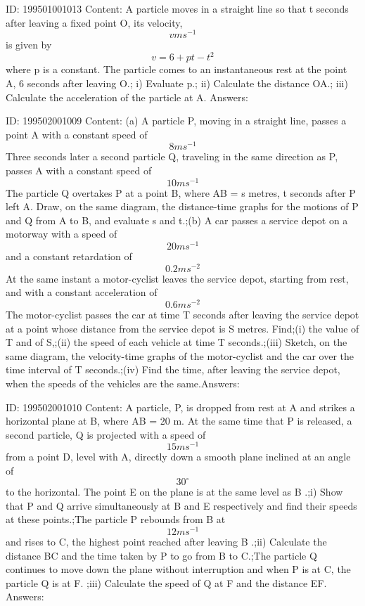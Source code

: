 \documentclass{article}
\begin{document}
ID: 199501001013
Content:
A particle moves in a straight line so that t seconds after leaving a fixed point O, its velocity, \[v ms^{-1}\] is given by \[v=6+pt-t^{2}\] where p is a constant. The particle comes to an instantaneous rest at the point A, 6 seconds after leaving O.;
i) Evaluate p.;
ii) Calculate the distance OA.;
iii) Calculate the acceleration of the particle at A.
Answers:

ID: 199502001009
Content:
(a)	A particle P, moving in a straight line, passes a point A with a constant speed of \[8 ms^{-1}\] Three seconds later a second particle Q, traveling in the same direction as P, passes A with a constant speed of \[10 ms^{-1}\] The particle Q overtakes P at a point B, where AB = s metres, t seconds after P left A. Draw, on the same diagram, the distance-time graphs for the motions of P and Q from A to B, and evaluate s and t.;(b)	A car passes a service depot on a motorway with a speed of \[20 ms^{-1}\]  and a constant retardation of \[0.2 ms^{-2}\] At the same instant a motor-cyclist leaves the service depot, starting from rest, and with a constant acceleration of \[0.6 ms^{-2}\] The motor-cyclist passes the car at time T seconds after leaving the service depot at a point whose distance from the service depot is S metres. Find;(i) the value of T and of S,;(ii) the speed of each vehicle at time T seconds.;(iii) Sketch, on the same diagram, the velocity-time graphs of the motor-cyclist and the car over the time interval of T seconds.;(iv)	Find the time, after leaving the service depot, when the speeds of the vehicles are the same.Answers:

ID: 199502001010
Content:
A particle, P, is dropped from rest at A and strikes a horizontal plane at B, where AB = 20 m. At the same time that P is released, a second particle, Q is projected with a speed of \[15ms^{-1} \]  from a point D, level with A, directly down a smooth plane inclined at an angle of \[30^{\circ}\] to the horizontal. The point E on the plane is at the same level as B .;i) Show that P and Q arrive simultaneously at B and E respectively and find their speeds at these points.;The particle P rebounds from B at \[12ms^{-1} \] and rises to C, the highest point reached after leaving B .;ii) Calculate the distance BC and the time taken by P to go from B to C.;The particle Q continues to move down the plane without interruption and when P is at C, the particle Q is at F.  ;iii) Calculate the speed of Q at F and the distance EF.
Answers:
\end{document}
